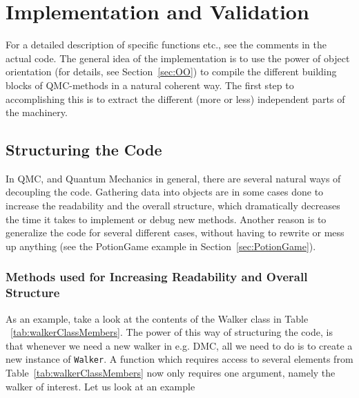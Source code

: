 \chapter{Implementation and Validation}

For a detailed description of specific functions etc., see the comments in the actual code. The general idea of the implementation is to use the power of object orientation (for details, see Section~\ref{sec:OO}) to compile the different building blocks of QMC-methods in a natural coherent way. The first step to accomplishing this is to extract the different (more or less) independent parts of the machinery.

\section{Structuring the Code}

In QMC, and Quantum Mechanics in general, there are several natural ways of decoupling the code. Gathering data into objects are in some cases done to increase the readability and the overall structure, which dramatically decreases the time it takes to implement or debug new methods. Another reason is to generalize the code for several different cases, without having to rewrite or mess up anything (see the PotionGame example in Section~\ref{sec:PotionGame}).

\subsection{Methods used for Increasing Readability and Overall Structure}

As an example, take a look at the contents of the Walker class in Table ~\ref{tab:walkerClassMembers}. The power of this way of structuring the code, is that whenever we need a new walker in e.g. DMC, all we need to do is to create a new instance of \verb+Walker+. A function which requires access to several elements from Table~\ref{tab:walkerClassMembers} now only requires one argument, namely the walker of interest. Let us look at an example

